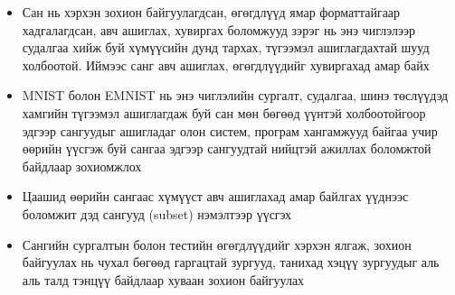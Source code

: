 \begin{itemize}
	\item Сан нь хэрхэн зохион байгуулагдсан, өгөгдлүүд ямар форматтайгаар хадгалагдсан, авч ашиглах, хувиргах боломжууд зэрэг нь энэ чиглэлээр судалгаа хийж буй хүмүүсийн дунд тархах, түгээмэл ашиглагдахтай шууд холбоотой. Иймээс санг авч ашиглах, өгөгдлүүдийг хувиргахад амар байх
	\item MNIST болон EMNIST нь энэ чиглэлийн сургалт, судалгаа, шинэ төслүүдэд хамгийн түгээмэл ашиглагдаж буй сан мөн бөгөөд үүнтэй холбоотойгоор эдгээр сангуудыг ашигладаг олон систем, програм хангамжууд байгаа учир өөрийн үүсгэж буй сангаа эдгээр сангуудтай нийцтэй ажиллах боломжтой байдлаар зохиомжлох\label{criteria:mnist-compatible}
	\item Цаашид өөрийн сангаас хүмүүст авч ашиглахад амар байлгах үүднээс боломжит дэд сангууд (subset) нэмэлтээр үүсгэх
	\item Сангийн сургалтын болон тестийн өгөгдлүүдийг хэрхэн ялгаж, зохион байгуулах нь чухал бөгөөд гаргацтай зургууд, танихад хэцүү зургуудыг аль аль талд тэнцүү байдлаар хуваан зохион байгуулах
\end{itemize}
